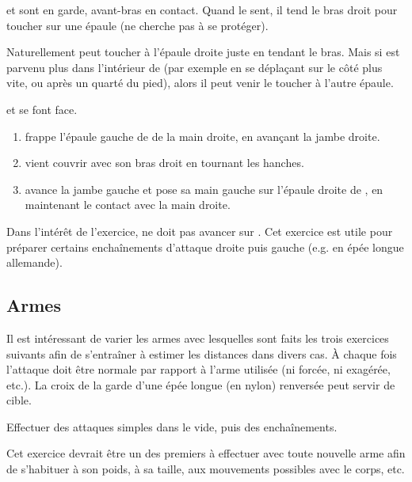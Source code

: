 \begin{exercice}
\label{struct:ex:contact:frappe-épaules}

\A et \D sont en garde, avant-bras en contact.
Quand \A le sent, il tend le bras droit pour toucher \D sur une épaule (\D ne cherche pas à se protéger).

Naturellement \A peut toucher \D à l'épaule droite juste en tendant le bras.
Mais si \A est parvenu plus dans l'intérieur de \D (par exemple en se déplaçant sur le côté plus vite, ou après un quarté du pied), alors il peut venir le toucher à l'autre épaule.

\end{exercice}


\begin{exercice}
\label{struct:ex:frappe-gauche-droite}

\A et \D se font face.

\begin{enumerate}
	\item \A frappe l'épaule gauche de \D de la main droite, en avançant la jambe droite.
	\item \D vient couvrir avec son bras droit en tournant les hanches.
	\item \A avance la jambe gauche et pose sa main gauche sur l'épaule droite de \D, en maintenant le contact avec la main droite.
\end{enumerate}

Dans l'intérêt de l'exercice, \D ne doit pas avancer sur \A.
Cet exercice est utile pour préparer certains enchaînements d'attaque droite puis gauche (e.g.
en épée longue allemande).

\end{exercice}


\subsection{Armes}


Il est intéressant de varier les armes avec lesquelles sont faits les trois exercices suivants afin de s'entraîner à estimer les distances dans divers cas.
À chaque fois l'attaque doit être normale par rapport à l'arme utilisée (ni forcée, ni exagérée, etc.).
La croix de la garde d'une épée longue (en nylon) renversée peut servir de cible.


\begin{exercice}
Effectuer des attaques simples dans le vide, puis des enchaînements.

Cet exercice devrait être un des premiers à effectuer avec toute nouvelle arme afin de s'habituer à son poids, à sa taille, aux mouvements possibles avec le corps, etc.
\end{exercice}


